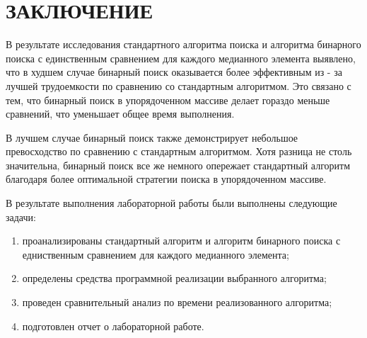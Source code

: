 \chapter*{\hfill{\centering ЗАКЛЮЧЕНИЕ}\hfill}

В результате исследования стандартного алгоритма поиска и алгоритма бинарного поиска с единственным сравнением для каждого медианного элемента выявлено, что в худшем случае бинарный поиск оказывается более эффективным из - за лучшей трудоемкости по сравнению со стандартным алгоритмом. 
Это связано с тем, что бинарный поиск в упорядоченном массиве делает гораздо меньше сравнений, что уменьшает общее время выполнения.

В лучшем случае бинарный поиск также демонстрирует небольшое превосходство по сравнению с стандартным алгоритмом. 
Хотя разница не столь значительна, бинарный поиск все же немного опережает стандартный алгоритм благодаря более оптимальной стратегии поиска в упорядоченном массиве.

В результате выполнения лабораторной работы были выполнены следующие задачи:

\begin{enumerate}[label={\arabic*)}]
	\item проанализированы стандартный алгоритм и алгоритм бинарного поиска с едниственным сравнением для каждого медианного элемента;
	\item определены средства программной реализации выбранного алгоритма;
	\item проведен сравнительный анализ по времени реализованного алгоритма;
	\item подготовлен отчет о лабораторной работе.
\end{enumerate}